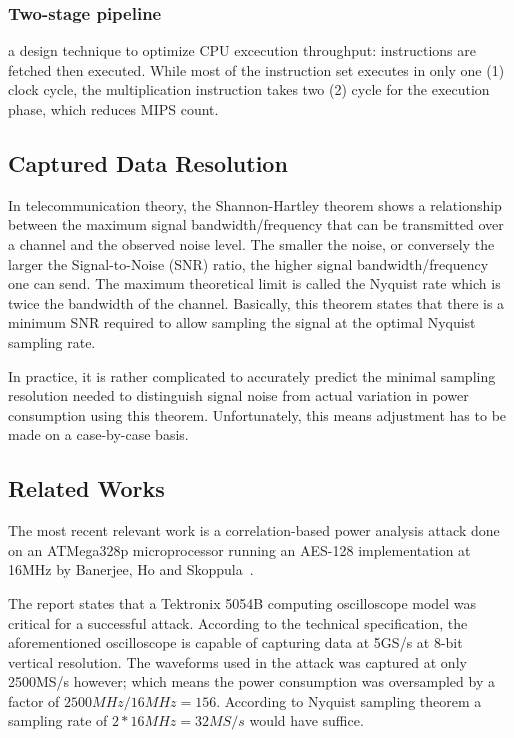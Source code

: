 \documentclass[conference]{IEEEtran}
\begin{document}
\subsubsection{Two-stage pipeline} a design technique to optimize CPU excecution throughput: instructions are fetched then executed. While most of the instruction set executes in only one (1) clock cycle, the multiplication instruction takes two (2) cycle for the execution phase, which reduces MIPS count.

\subsection{Captured Data Resolution}
In telecommunication theory, the Shannon-Hartley theorem \cite{shannon1949communication} shows a relationship between the maximum signal bandwidth/frequency that can be transmitted over a channel and the observed noise level. The smaller the noise, or conversely the larger the Signal-to-Noise (SNR) ratio, the higher signal bandwidth/frequency one can send. The maximum theoretical limit is called the Nyquist rate which is twice the bandwidth of the channel. Basically, this theorem states that there is a minimum SNR required to allow sampling the signal at the optimal Nyquist sampling rate.

In practice, it is rather complicated to accurately predict the minimal sampling resolution needed to distinguish signal noise from actual variation in power consumption using this theorem. Unfortunately, this means adjustment has to be made on a case-by-case basis.

\subsection{Related Works}
The most recent relevant work is a correlation-based power analysis attack done on an ATMega328p microprocessor running an AES-128 implementation at 16MHz by Banerjee, Ho and Skoppula~\cite{Banerjee2015}.

The report states that a Tektronix 5054B computing oscilloscope model was critical for a successful attack. According to the technical specification, the aforementioned oscilloscope is capable of capturing data at 5GS/s at 8-bit vertical resolution. The waveforms used in the attack was captured at only 2500MS/s however; which means the power consumption was oversampled by a factor of $2500\mathit{MHz}/16\mathit{MHz}=156$. According to Nyquist sampling theorem a sampling rate of $2*16\mathit{MHz}=32\mathit{MS/s}$ would have suffice.
\end{document}
